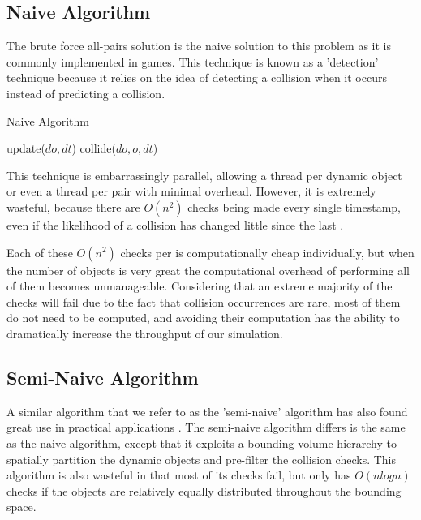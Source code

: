 \documentclass[conference]{IEEEtran}
\begin{document}
\subsection{Naive Algorithm}

The brute force all-pairs solution is the naive solution to this problem as it is commonly implemented in games. This technique is known as a 'detection' technique because it relies on the idea of detecting a collision when it occurs instead of predicting a collision.  

\begin{algorithm}
\caption{Naive Algorithm}
\begin{algorithmic}
		\STATE update($do,dt$)  
				\STATE collide($do, o, dt$)
			\ENDIF
		\ENDFOR
	\ENDFOR
\ENDFOR
\end{algorithmic}
\end{algorithm}

This technique is embarrassingly parallel, allowing a thread per dynamic object or even a thread per pair with minimal overhead.  However, it is extremely
wasteful, because there are $O(n^2)$ checks being made every single timestamp, even if the likelihood of a collision has changed little since the last  \cite{Seningood}.  

Each of these $O(n^2)$ checks per  is computationally cheap individually, but when the number of objects is very great the computational overhead of performing all of them becomes
unmanageable. Considering that an extreme majority of the checks will fail due to the fact that collision occurrences are rare, most of them do not need to be computed, and avoiding their computation has the ability to dramatically increase the 
throughput of our simulation.

\subsection{Semi-Naive Algorithm}

A similar algorithm that we refer to as the 'semi-naive' algorithm has also found great use in practical applications \cite{Bittner02hierarchicaltechniques}.  The semi-naive algorithm differs is the same as the naive algorithm, except that it exploits a bounding volume hierarchy to spatially partition the dynamic objects and pre-filter the collision checks.  This algorithm is also wasteful in that most of its checks fail, but only has $O(n log n)$ checks if the objects are relatively equally distributed throughout the bounding space.
\end{document}

